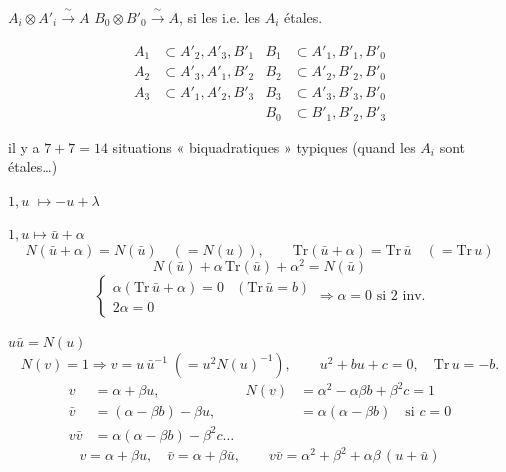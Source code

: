 \documentclass[11pt,a4paper]{article}
\begin{document}

$A_i \otimes A'_i \xrightarrow{\ \sim\ } A$ \quad [$B_i \subset B'_i$] \quad $B_0 \otimes B'_0 \xrightarrow{\ \sim\ } A$, si les  i.e. les $A_i$ étales.

\begin{align*}
  A_1 &\subset A'_2, A'_3, B'_1 &  B_1 &\subset A'_1, B'_1, B'_0 \\
  A_2 &\subset A'_3, A'_1, B'_2 &  B_2 &\subset A'_2, B'_2, B'_0 \\
  A_3 &\subset A'_1, A'_2, B'_3 &  B_3 &\subset A'_3, B'_3, B'_0 \\
      &                          &  B_0 &\subset B'_1, B'_2, B'_3
\end{align*}

il y a $7 + 7 = 14$ situations « biquadratiques » typiques (quand les $A_i$ sont étales…)


$1, u$ \quad $\longmapsto -u + \lambda$

$1, u \longmapsto \bar{u} + \alpha$
\[
  N(\bar u + \alpha) = N(\bar u) \quad (= N(u)), \qquad
  \mathrm{Tr}(\bar u + \alpha) = \mathrm{Tr}\,\bar u \quad (= \mathrm{Tr}\,u)
\]
\[
  N(\bar u) + \alpha\,\mathrm{Tr}(\bar u) + \alpha^2 = N(\bar u)
\]
\[
  \begin{cases} \alpha(\mathrm{Tr}\,\bar u + \alpha) = 0 & (\mathrm{Tr}\,\bar u = b) \\ 2\alpha = 0 \end{cases}
  \Longrightarrow \alpha = 0 \text{ si } 2 \text{ inv.}
\]

 \qquad $u\bar u = N(u)$
\[
  N(v) = 1 \Longrightarrow v = u\,\bar u^{-1} \;(= u^2 N(u)^{-1}), \qquad u^2 + bu + c = 0, \quad \mathrm{Tr}\,u = -b .
\]
\begin{align*}
  v &= \alpha + \beta u, & N(v) &= \alpha^2 - \alpha\beta b + \beta^2 c = 1 \\
  \bar v &= (\alpha - \beta b) - \beta u, & &= \alpha(\alpha - \beta b) \quad \text{si } c = 0 \\
  v \bar v &= \alpha(\alpha - \beta b) - \beta^2 c \ldots
\end{align*}
\[
  v = \alpha + \beta u, \quad \bar v = \alpha + \beta \bar u, \qquad
  v\bar v = \alpha^2 + \beta^2 + \alpha\beta\,(u + \bar u)
\]
\end{document}
